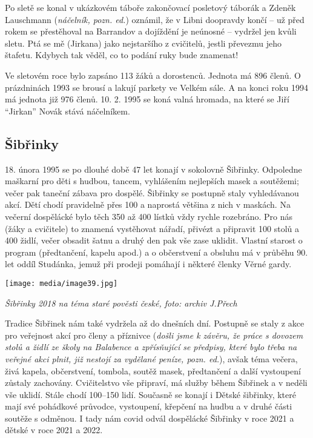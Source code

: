 Po sletě se konal v ukázkovém táboře zakončovací posletový táborák a
Zdeněk Lauschmann (\emph{náčelník, pozn. ed.}) oznámil, že v Libni
doopravdy končí -- už před rokem se přestěhoval na Barrandov a dojíždění
je neúnosné -- vydržel jen kvůli sletu. Ptá se mě (Jirkana) jako
nejstaršího z cvičitelů, jestli převezmu jeho štafetu. Kdybych tak
věděl, co to podání ruky bude znamenat!

Ve sletovém roce bylo zapsáno 113 žáků a dorostenců. Jednota má 896
členů. O prázdninách 1993 se brousí a lakují parkety ve Velkém sále. A
na konci roku 1994 má jednota již 976 členů. 10. 2. 1995 se koná valná
hromada, na které se Jiří ``Jirkan'' Novák stává náčelníkem.

\subsection{Šibřinky}\label{ux161ibux159inky}

18. února 1995 se po dlouhé době 47 let konají v sokolovně Šibřinky.
Odpoledne maškarní pro děti s hudbou, tancem, vyhlášením nejlepších
masek a soutěžemi; večer pak taneční zábava pro dospělé. Šibřinky se
postupně staly vyhledávanou akcí. Dětí chodí pravidelně přes 100 a
naprostá většina z nich v maskách. Na večerní dospělácké bylo těch 350
až 400 lístků vždy rychle rozebráno. Pro nás (žáky a cvičitele) to
znamená vystěhovat nářadí, přivézt a připravit 100 stolů a 400 židlí,
večer obsadit šatnu a druhý den pak vše zase uklidit. Vlastní starost o
program (předtančení, kapelu apod.) a o občerstvení a obsluhu má v
průběhu 90. let oddíl Studánka, jemuž při prodeji pomáhají i některé
členky Věrné gardy.

\texttt{[image: media/image39.jpg]}

\emph{Šibřinky 2018 na téma staré pověsti české, foto: archiv J.Přech}

Tradice Šibřinek nám také vydržela až do dnešních dní. Postupně se staly
z akce pro veřejnost akcí pro členy a příznivce (\emph{došli jsme k
závěru, že práce s dovozem stolů a židlí ze školy na Balabence a
zpřísňující se předpisy, které bylo třeba na veřejné akci plnit, již
nestojí za vydělané peníze, pozn. ed.}), avšak téma večera, živá kapela,
občerstvení, tombola, soutěž masek, předtančení a další vystoupení
zůstaly zachovány. Cvičitelstvo vše připraví, má služby během Šibřinek a
v neděli vše uklidí. Stále chodí 100--150 lidí. Současně se konají i
Dětské šibřinky, které mají své pohádkové průvodce, vystoupení, křepčení
na hudbu a v druhé části soutěže s odměnou. I tady nám covid odvál
dospělácké Šibřinky v roce 2021 a dětské v roce 2021 a 2022.

